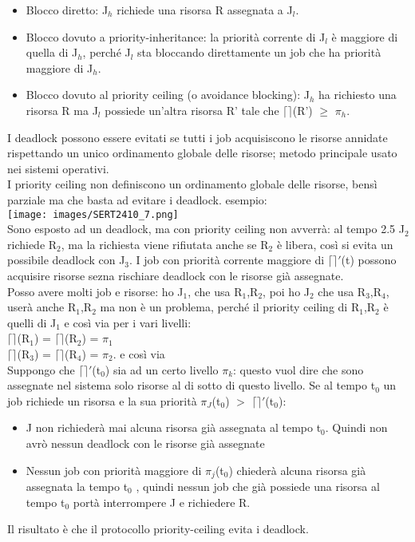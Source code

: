 \documentclass[18px]{article}
\begin{document}
\begin{itemize}
\item Blocco diretto: J$_{h}$ richiede una risorsa R assegnata a J$_{l}$.
\item Blocco dovuto a priority-inheritance: la priorità corrente di J$_{l}$ è maggiore di quella di J$_{h}$, perché J$_{l}$ sta bloccando direttamente un job che ha priorità maggiore di J$_{h}$.
\item Blocco dovuto al priority ceiling (o avoidance blocking): J$_{h}$ ha richiesto una risorsa R ma J$_{l}$ possiede un'altra risorsa R' tale che $\lceil\rceil$(R') $\geq$ $\pi_{h}$.
\end{itemize}
I deadlock possono essere evitati se tutti i job acquisiscono le risorse annidate rispettando un unico ordinamento globale delle risorse; metodo principale usato nei sistemi operativi.\\ I priority ceiling non definiscono un ordinamento globale delle risorse, bensì parziale ma che basta ad evitare i deadlock. esempio:\\
\texttt{[image: images/SERT2410\_7.png]}\\
Sono esposto ad un deadlock, ma con priority ceiling non avverrà: al tempo 2.5 J$_{2}$ richiede R$_{2}$, ma la richiesta viene rifiutata anche se R$_{2}$ è libera, così si evita un possibile deadlock con J$_{3}$. I job con priorità corrente maggiore di $\lceil\rceil'$(t) possono acquisire risorse sezna rischiare deadlock con le risorse già assegnate.\\ Posso avere molti job e risorse: ho J$_{1}$, che usa R$_{1}$,R$_{2}$, poi ho J$_{2}$ che usa R$_{3}$,R$_{4}$, userà anche R$_{1}$,R$_{2}$ ma non è un problema, perché il priority ceiling di R$_{1}$,R$_{2}$ è quelli di J$_{1}$ e così via per i vari livelli:\\
$\lceil\rceil$(R$_{1}$) = $\lceil\rceil$(R$_{2}$) = $\pi_{1}$\\
$\lceil\rceil$(R$_{3}$) = $\lceil\rceil$(R$_{4}$) = $\pi_{2}$.
e così via \\ Suppongo che $\lceil\rceil'$(t$_{0}$) sia ad un certo livello $\pi_{k}$: questo vuol dire che sono assegnate nel sistema solo risorse al di sotto di questo livello. Se al tempo t$_{0}$ un job richiede un risorsa e la sua priorità $\pi_{J}$(t$_{0}$) $>$ $\lceil\rceil'$(t$_{0}$):
\begin{itemize}
\item J non richiederà mai alcuna risorsa già assegnata al tempo t$_{0}$. Quindi non avrò nessun deadlock con le risorse già assegnate
\item Nessun job con priorità maggiore di $\pi_{j}$(t$_{0}$) chiederà alcuna risorsa già assegnata la tempo t$_{0}$ , quindi nessun job che già possiede una risorsa al tempo t$_{0}$ portà interrompere J e richiedere R.
\end{itemize}
Il risultato è che il protocollo priority-ceiling evita i deadlock.
\end{document}
